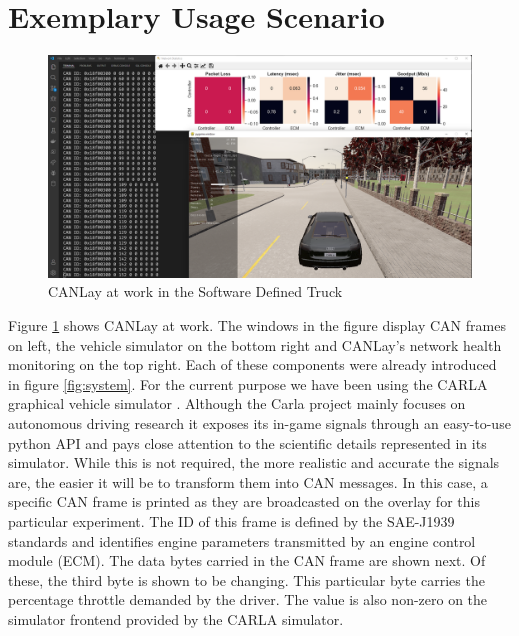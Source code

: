 \documentclass[letterpaper,twocolumn,12pt]{article}
\begin{document}
\section{Exemplary Usage Scenario}\label{sec:usage}
\begin{figure}[]
    \centering
    \includegraphics[width=\linewidth]{images/usability.png}
    \caption{CANLay at work in the Software Defined Truck}
    \label{fig:usabiity}
\end{figure}
Figure \ref{fig:usabiity} shows CANLay at work. The windows in the figure display CAN frames on left, the vehicle simulator on the bottom right and CANLay's network health monitoring on the top right. Each of these components were already introduced in figure \ref{fig:system}. For the current purpose we have been using the CARLA graphical vehicle simulator \cite{Dosovitskiy17}. 
Although the Carla project mainly focuses on autonomous driving research it exposes its in-game signals through an easy-to-use python API and pays close attention to the scientific details represented in its simulator. While this is not required, the more realistic and accurate the signals are, the easier it will be to transform them into CAN messages. In this case, a specific CAN frame is printed as they are broadcasted on the overlay for this particular experiment. The ID of this frame is defined by the SAE-J1939 standards \cite{society_of_automotive_engineers_sae_nodate} and identifies engine parameters transmitted by an engine control module (ECM). The data bytes carried in the CAN frame are shown next. Of these, the third byte is shown to be changing. This particular byte carries the percentage throttle demanded by the driver. The value is also non-zero on the simulator frontend provided by the CARLA simulator.
\end{document}
